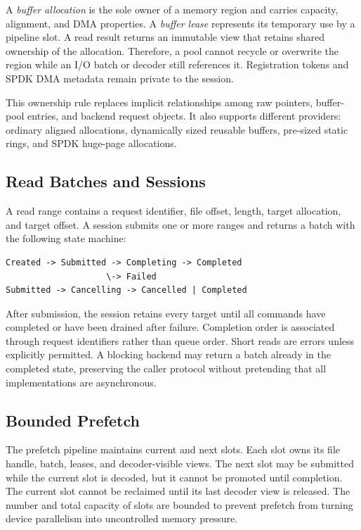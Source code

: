 \documentclass[conference]{IEEEtran}
\begin{document}
A \emph{buffer allocation} is the sole owner of a memory region and carries
capacity, alignment, and DMA properties.  A \emph{buffer lease} represents its
temporary use by a pipeline slot.  A read result returns an immutable view that
retains shared ownership of the allocation.  Therefore, a pool cannot recycle
or overwrite the region while an I/O batch or decoder still references it.
Registration tokens and SPDK DMA metadata remain private to the session.

This ownership rule replaces implicit relationships among raw pointers,
buffer-pool entries, and backend request objects.  It also supports different
providers: ordinary aligned allocations, dynamically sized reusable buffers,
pre-sized static rings, and SPDK huge-page allocations.

\subsection{Read Batches and Sessions}

A read range contains a request identifier, file offset, length, target
allocation, and target offset.  A session submits one or more ranges and
returns a batch with the following state machine:

\begin{verbatim}
Created -> Submitted -> Completing -> Completed
                    \-> Failed
Submitted -> Cancelling -> Cancelled | Completed
\end{verbatim}

After submission, the session retains every target until all commands have
completed or have been drained after failure.  Completion order is associated
through request identifiers rather than queue order.  Short reads are errors
unless explicitly permitted.  A blocking backend may return a batch already in
the completed state, preserving the caller protocol without pretending that
all implementations are asynchronous.

\subsection{Bounded Prefetch}

The prefetch pipeline maintains current and next slots.  Each slot owns its
file handle, batch, leases, and decoder-visible views.  The next slot may be
submitted while the current slot is decoded, but it cannot be promoted until
completion.  The current slot cannot be reclaimed until its last decoder view
is released.  The number and total capacity of slots are bounded to prevent
prefetch from turning device parallelism into uncontrolled memory pressure.
\end{document}
